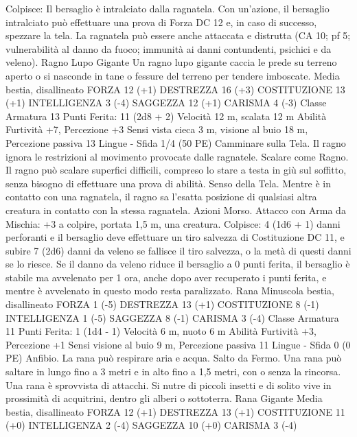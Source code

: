 \begin{multicols}{2}
Colpisce: Il bersaglio è intralciato dalla ragnatela. Con
un’azione, il bersaglio intralciato può effettuare una prova di
Forza DC 12 e, in caso di successo, spezzare la tela. La ragnatela
può essere anche attaccata e distrutta (CA 10; pf 5; vulnerabilità
al danno da fuoco; immunità ai danni contundenti, psichici e da
veleno).
Ragno Lupo Gigante
Un ragno lupo gigante caccia le prede su terreno aperto
o si nasconde in tane o fessure del terreno per tendere
imboscate.
Media bestia, disallineato
FORZA 12 (+1)
DESTREZZA 16 (+3)
COSTITUZIONE 13 (+1)
INTELLIGENZA 3 (-4)
SAGGEZZA 12 (+1)
CARISMA 4 (-3)
Classe Armatura 13
\hspace*{0pt}\hfill{Punti Ferita}: 11 (2d8 + 2)
Velocità 12 m, scalata 12 m
Abilità Furtività +7, Percezione +3
Sensi vista cieca 3 m, visione al buio 18 m, Percezione passiva
13
Lingue -
Sfida 1/4 (50 PE)
Camminare sulla Tela. Il ragno ignora le restrizioni al
movimento provocate dalle ragnatele.
Scalare come Ragno. Il ragno può scalare superfici difficili,
compreso lo stare a testa in giù sul soffitto, senza bisogno di
effettuare una prova di abilità.
Senso della Tela. Mentre è in contatto con una ragnatela, il
ragno sa l’esatta posizione di qualsiasi altra creatura in contatto
con la stessa ragnatela.
Azioni
Morso. Attacco con Arma da Mischia: +3 a colpire, portata 1,5
m, una creatura.
Colpisce: 4 (1d6 + 1) danni perforanti e il bersaglio deve
effettuare un tiro salvezza di Costituzione DC 11, e subire 7
(2d6) danni da veleno se fallisce il tiro salvezza, o la metà di
questi danni se lo riesce. Se il danno da veleno riduce il bersaglio
a 0 punti ferita, il bersaglio è stabile ma avvelenato per 1 ora,
anche dopo aver recuperato i punti ferita, e mentre è avvelenato
in questo modo resta paralizzato.
Rana
Minuscola bestia, disallineato
FORZA 1 (-5)
DESTREZZA 13 (+1)
COSTITUZIONE 8 (-1)
INTELLIGENZA 1 (-5)
SAGGEZZA 8 (-1)
CARISMA 3 (-4)
Classe Armatura 11
\hspace*{0pt}\hfill{Punti Ferita}: 1 (1d4 - 1)
Velocità 6 m, nuoto 6 m
Abilità Furtività +3, Percezione +1
Sensi visione al buio 9 m, Percezione passiva 11
Lingue -
Sfida 0 (0 PE)
Anfibio. La rana può respirare aria e acqua.
Salto da Fermo. Una rana può saltare in lungo fino a 3 metri e in
alto fino a 1,5 metri, con o senza la rincorsa.
Una rana è sprovvista di attacchi. Si nutre di piccoli
insetti e di solito vive in prossimità di acquitrini, dentro
gli alberi o sottoterra.
Rana Gigante
Media bestia, disallineato
FORZA 12 (+1)
DESTREZZA 13 (+1)
COSTITUZIONE 11 (+0)
INTELLIGENZA 2 (-4)
SAGGEZZA 10 (+0)
CARISMA 3 (-4)

\end{multicols}
